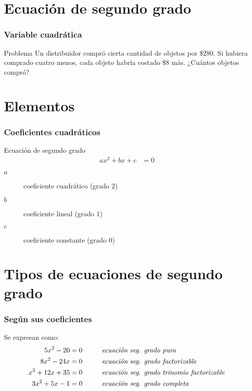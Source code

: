 \documentclass[12pt,spanish,x11names]{beamer}
\title{\talktitle}
\subtitle{\talksubtitle}
\author{\talkauthor}
\institute{\talkaffiliation}
\date{\footnotesize{\emph{\href{\talkblog}{\talkemail}}}}
\begin{document}
\begin{frame}
\titlepage
\end{frame}
\section{Ecuación de segundo grado}
\begin{frame}
  \frametitle{Variable cuadrática}
  \begin{exampleblock}{Problema}
    Un distribuidor compró cierta cantidad de objetos por $\$280$. Si hubiera
    comprado cuatro menos, cada objeto habría costado $\$8$ más. ¿Cuántos
    objetos compró?
  \end{exampleblock}
\end{frame}
\section{Elementos}
\begin{frame}
  \frametitle{Coeficientes cuadráticos}
  \begin{block}{Ecuación de segundo grado}
    \begin{align*}
      \label{eq:1}
      ax^2+bx+c&=0
    \end{align*}
    \begin{description}
    \item[$a$] coeficiente cuadrático (grado $2$)
    \item[$b$] coeficiente lineal (grado $1$)
    \item[$c$] coeficiente constante (grado $0$)
    \end{description}
  \end{block}
\end{frame}
\section{Tipos de ecuaciones de segundo grado}
\begin{frame}
  \frametitle{Según sus coeficientes}
  \begin{exampleblock}{Se expresan como:}
    \begin{align*}
      5x^2-20&=0\hspace{1cm}\text{\emph{ecuación seg. grado pura}}\\
      8x^2-24x&=0\hspace{1cm}\text{\emph{ecuación seg. grado factorizable}}\\
      x^2+12x+35&=0\hspace{1cm}\text{\emph{ecuación seg. grado trinomio factorizable}}\\
      3x^2+5x-1&=0\hspace{1cm}\text{\emph{ecuación seg. grado completa}}
    \end{align*}
  \end{exampleblock}
\end{frame}
\end{document}
